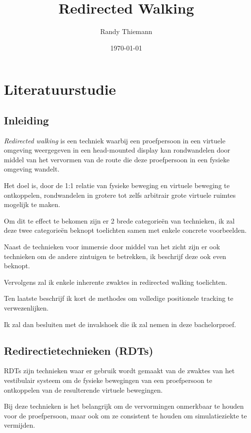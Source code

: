 \documentclass[a4paper,12pt]{article}
\begin{document}
\author{Randy Thiemann} 
\title{Redirected Walking} 
\date{\today} 
\maketitle

\section{Literatuurstudie}
\subsection{Inleiding}
\emph{Redirected walking} is een techniek waarbij een proefpersoon in een virtuele
omgeving weergegeven in een head-mounted display kan rondwandelen door middel
van het vervormen van de route die deze proefpersoon in een fysieke omgeving 
wandelt.

Het doel is, door de 1:1 relatie van fysieke beweging en virtuele beweging te
ontkoppelen, rondwandelen in grotere tot zelfs arbitrair grote virtuele ruimtes
mogelijk te maken.

Om dit te effect te bekomen zijn er 2 brede categorie\"en van technieken, ik zal
deze twee categorie\"en beknopt toelichten samen met enkele concrete voorbeelden.

Naast de technieken voor immersie door middel van het zicht zijn er ook 
technieken om de andere zintuigen te betrekken, ik beschrijf deze ook even 
beknopt.

Vervolgens zal ik enkele inherente zwaktes in redirected walking toelichten.

Ten laatste beschrijf ik kort de methodes om volledige positionele tracking te
verwezenlijken.

Ik zal dan besluiten met de invalshoek die ik zal nemen in deze bachelorproef.


\subsection{Redirectietechnieken (RDTs)}
RDTs zijn technieken waar er gebruik wordt gemaakt van de zwaktes van het 
vestibulair systeem om de fysieke bewegingen van een proefpersoon te ontkoppelen
van de resulterende virtuele bewegingen.

Bij deze technieken is het belangrijk om de vervormingen onmerkbaar te houden
voor de proefpersoon, maar ook om ze consistent te houden om simulatieziekte te
vermijden.\cite{kohn01}
\end{document}
